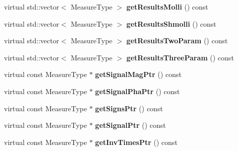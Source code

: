 \begin{DoxyCompactItemize}
\item 
virtual std\+::vector$<$ Measure\+Type $>$ {\bfseries get\+Results\+Molli} () const \hypertarget{class_ox_1_1_test_data_a68a2cefeed3da1c1dac7a34256b9d640}{}\label{class_ox_1_1_test_data_a68a2cefeed3da1c1dac7a34256b9d640}

\item 
virtual std\+::vector$<$ Measure\+Type $>$ {\bfseries get\+Results\+Shmolli} () const \hypertarget{class_ox_1_1_test_data_aece21264e7f357c50e2d157f077127f5}{}\label{class_ox_1_1_test_data_aece21264e7f357c50e2d157f077127f5}

\item 
virtual std\+::vector$<$ Measure\+Type $>$ {\bfseries get\+Results\+Two\+Param} () const \hypertarget{class_ox_1_1_test_data_a594d22cee0f18a220811c323d5e59ff4}{}\label{class_ox_1_1_test_data_a594d22cee0f18a220811c323d5e59ff4}

\item 
virtual std\+::vector$<$ Measure\+Type $>$ {\bfseries get\+Results\+Three\+Param} () const \hypertarget{class_ox_1_1_test_data_a958d75edb7d2b4a3ef54c7d36283fae8}{}\label{class_ox_1_1_test_data_a958d75edb7d2b4a3ef54c7d36283fae8}

\item 
virtual const Measure\+Type $\ast$ {\bfseries get\+Signal\+Mag\+Ptr} () const \hypertarget{class_ox_1_1_test_data_a9f625acf214f62d6cdfee00c924ef9b0}{}\label{class_ox_1_1_test_data_a9f625acf214f62d6cdfee00c924ef9b0}

\item 
virtual const Measure\+Type $\ast$ {\bfseries get\+Signal\+Pha\+Ptr} () const \hypertarget{class_ox_1_1_test_data_aafe59c86537fb24e513443e34f2b506d}{}\label{class_ox_1_1_test_data_aafe59c86537fb24e513443e34f2b506d}

\item 
virtual const Measure\+Type $\ast$ {\bfseries get\+Signs\+Ptr} () const \hypertarget{class_ox_1_1_test_data_a98127c877fabc49a7112489e928cda05}{}\label{class_ox_1_1_test_data_a98127c877fabc49a7112489e928cda05}

\item 
virtual const Measure\+Type $\ast$ {\bfseries get\+Signal\+Ptr} () const \hypertarget{class_ox_1_1_test_data_a7c52dbd7292dfafd5e9d95eb9d701e19}{}\label{class_ox_1_1_test_data_a7c52dbd7292dfafd5e9d95eb9d701e19}

\item 
virtual const Measure\+Type $\ast$ {\bfseries get\+Inv\+Times\+Ptr} () const \hypertarget{class_ox_1_1_test_data_ad6f19708661e0722df977b8dacbf88e7}{}\label{class_ox_1_1_test_data_ad6f19708661e0722df977b8dacbf88e7}


\end{DoxyCompactItemize}
